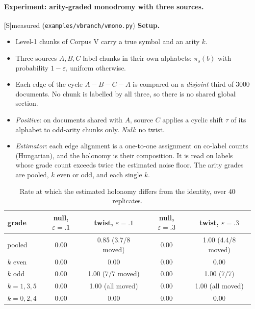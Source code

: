 \documentclass[11pt]{article}
\theoremstyle{definition}
\theoremstyle{remark}
\newcommand{\src}[1]{\textsf{\small[#1]}}
\newcommand{\st}[1]{\textsf{\small\color{gray}#1}}
\begin{document}
\paragraph{Experiment: arity-graded monodromy with three sources.}\src{S}\st{measured} (\texttt{examples/vbranch/vmono.py})
\textbf{Setup.}
\begin{itemize}
  \item Level-1 chunks of Corpus V carry a true symbol and an arity $k$.
  \item Three sources $A,B,C$ label chunks in their own alphabets: $\pi_s(b)$ with probability $1-\varepsilon$, uniform otherwise.
  \item Each edge of the cycle $A\!-\!B\!-\!C\!-\!A$ is compared on a \emph{disjoint} third of 3000 documents. No chunk is labelled by all three, so there is no shared global section.
  \item \emph{Positive}: on documents shared with $A$, source $C$ applies a cyclic shift $\tau$ of its alphabet to odd-arity chunks only. \emph{Null}: no twist.
  \item \emph{Estimator}: each edge alignment is a one-to-one assignment on co-label counts (Hungarian), and the holonomy is their composition. It is read on labels whose grade count exceeds twice the estimated noise floor. The arity grades are pooled, $k$ even or odd, and each single $k$.
\end{itemize}
\begin{table}[!htbp]\centering\small
\begin{tabular}{lcccc}
\toprule
grade & null, $\varepsilon=.1$ & twist, $\varepsilon=.1$ & null, $\varepsilon=.3$ & twist, $\varepsilon=.3$\\
\midrule
pooled & 0.00 & 0.85 (3.7/8 moved) & 0.00 & 1.00 (4.4/8 moved)\\
$k$ even & 0.00 & 0.00 & 0.00 & 0.00\\
$k$ odd & 0.00 & 1.00 (7/7 moved) & 0.00 & 1.00 (7/7)\\
$k=1,3,5$ & 0.00 & 1.00 (all moved) & 0.00 & 1.00 (all moved)\\
$k=0,2,4$ & 0.00 & 0.00 & 0.00 & 0.00\\
\bottomrule
\end{tabular}
\caption{Rate at which the estimated holonomy differs from the identity, over 40 replicates.}
\end{table}
\end{document}
